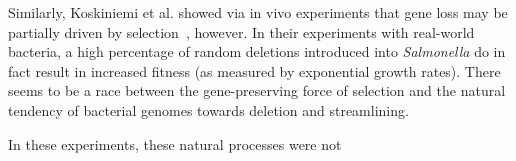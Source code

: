 Similarly, Koskiniemi et al. showed via in vivo experiments that gene loss may be partially driven by selection~\cite{koskiniemi2012}, however. In their experiments with real-world bacteria, a high percentage of random deletions introduced into \textit{Salmonella} do in fact result in increased fitness (as measured by exponential growth rates). There seems to be a race between the gene-preserving force of selection and the natural tendency of bacterial genomes towards deletion and streamlining. 

In these experiments, these natural processes were not  